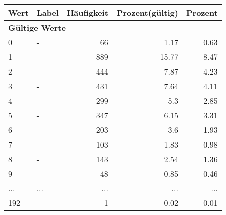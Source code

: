      \begin{longtable}{lXrrr}
     \toprule
     \textbf{Wert} & \textbf{Label} & \textbf{Häufigkeit} & \textbf{Prozent(gültig)} & \textbf{Prozent} \\
     \endhead
     \midrule
     \multicolumn{5}{l}{\textbf{Gültige Werte}}\\
        0 & \multicolumn{1}{X}{-} & %
          \num{66} &
          \num[round-mode=places,round-precision=2]{1.17} &
          \num[round-mode=places,round-precision=2]{0.63} \\
        1 & \multicolumn{1}{X}{-} & %
          \num{889} &
          \num[round-mode=places,round-precision=2]{15.77} &
          \num[round-mode=places,round-precision=2]{8.47} \\
        2 & \multicolumn{1}{X}{-} & %
          \num{444} &
          \num[round-mode=places,round-precision=2]{7.87} &
          \num[round-mode=places,round-precision=2]{4.23} \\
        3 & \multicolumn{1}{X}{-} & %
          \num{431} &
          \num[round-mode=places,round-precision=2]{7.64} &
          \num[round-mode=places,round-precision=2]{4.11} \\
        4 & \multicolumn{1}{X}{-} & %
          \num{299} &
          \num[round-mode=places,round-precision=2]{5.3} &
          \num[round-mode=places,round-precision=2]{2.85} \\
        5 & \multicolumn{1}{X}{-} & %
          \num{347} &
          \num[round-mode=places,round-precision=2]{6.15} &
          \num[round-mode=places,round-precision=2]{3.31} \\
        6 & \multicolumn{1}{X}{-} & %
          \num{203} &
          \num[round-mode=places,round-precision=2]{3.6} &
          \num[round-mode=places,round-precision=2]{1.93} \\
        7 & \multicolumn{1}{X}{-} & %
          \num{103} &
          \num[round-mode=places,round-precision=2]{1.83} &
          \num[round-mode=places,round-precision=2]{0.98} \\
        8 & \multicolumn{1}{X}{-} & %
          \num{143} &
          \num[round-mode=places,round-precision=2]{2.54} &
          \num[round-mode=places,round-precision=2]{1.36} \\
        9 & \multicolumn{1}{X}{-} & %
          \num{48} &
          \num[round-mode=places,round-precision=2]{0.85} &
          \num[round-mode=places,round-precision=2]{0.46} \\
       ... & ... & ... & ... & ... \\
        192 & \multicolumn{1}{X}{-} & %
          \num{1} &
          \num[round-mode=places,round-precision=2]{0.02} &
          \num[round-mode=places,round-precision=2]{0.01} \\


\end{longtable}
